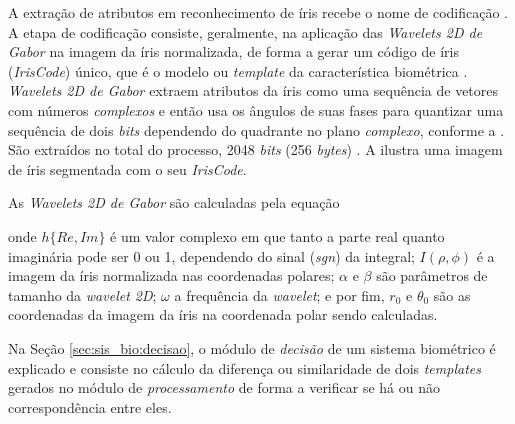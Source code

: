 
\par A extração de atributos em reconhecimento de íris recebe o nome de codificação \cite{daugman2004}. A etapa de codificação consiste, geralmente, na aplicação das \textit{Wavelets 2D de Gabor} na imagem da íris normalizada, de forma a gerar um código de íris (\textit{IrisCode}) único, que é o modelo ou \textit{template} da característica biométrica \cite{daugman2006}. \textit{Wavelets 2D de Gabor} extraem atributos da íris como uma sequência de vetores com números \textit{complexos} e então usa os ângulos de suas fases para quantizar uma sequência de dois \textit{bits} dependendo do quadrante no plano \textit{complexo}, conforme a  \cite{daugman2004}. São extraídos no total do processo, 2048 \textit{bits} (256 \textit{bytes}) \cite{daugman2004}. A  ilustra uma imagem de íris segmentada com o seu \textit{IrisCode}.



\par As \textit{Wavelets 2D de Gabor} são calculadas pela equação

\noindent onde $h\{Re,Im\}$ é um valor complexo em que tanto a parte real quanto imaginária pode ser 0 ou 1, dependendo do sinal (\textit{sgn}) da integral; $I(\rho,\phi)$ é a imagem da íris normalizada nas coordenadas polares; $\alpha$ e $\beta$ são parâmetros de tamanho da \textit{wavelet 2D}; $\omega$ a frequência da \textit{wavelet}; e por fim, $r_{0}$ e $\theta_{0}$ são as coordenadas da imagem da íris na coordenada polar sendo calculadas.

\par Na Seção \ref{sec:sis_bio:decisao}, o módulo de \textit{decisão} de um sistema biométrico é explicado e consiste no cálculo da diferença ou similaridade de dois \textit{templates} gerados no módulo de \textit{processamento} de forma a verificar se há ou não correspondência entre eles.

